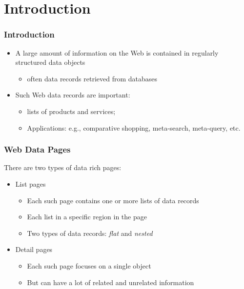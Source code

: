 \documentclass[svgnames]{beamer}
\subtitle{Web Data Extraction}
\begin{document}
\maketitle
\makeoutline

\section{Introduction}

\begin{frame} \frametitle{Introduction}
  
  \begin{itemize}
  \item A large amount of information on the Web is contained in regularly
    structured data objects
    \begin{itemize}
    \item often data records retrieved from databases
    \end{itemize}
  \item Such Web data records are important:
    \begin{itemize}
    \item lists of products and services;
    \item Applications: e.g., comparative shopping, meta-search, meta-query,
      etc.
    \end{itemize}
  \end{itemize}

\end{frame}


\begin{frame} \frametitle{Web Data Pages}

  There are two types of data rich pages:
  \begin{itemize}
  \item List pages
    \begin{itemize}
    \item Each such page contains one or more lists of data records
    \item Each list in a specific region in the page
    \item Two types of data records: \emph{flat} and \emph{nested}
    \end{itemize}
  \item Detail pages
    \begin{itemize}
    \item Each such page focuses on a single object
    \item But can have a lot of related and unrelated information
    \end{itemize}
  \end{itemize}
  
\end{frame}
\end{document}
